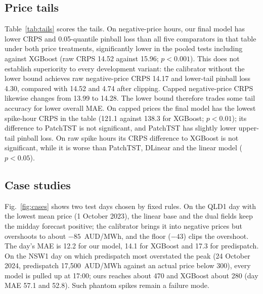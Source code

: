 \documentclass[preprint,12pt]{elsarticle}
\begin{document}
\subsection{Price tails}
Table~\ref{tab:tails} scores the tails. On negative-price hours, our final model has lower CRPS and 0.05-quantile pinball loss than all five comparators in that table under both price treatments, significantly lower in the pooled tests including against XGBoost (raw CRPS 14.52 against 15.96; $p<0.001$). This does not establish superiority to every development variant: the calibrator without the lower bound achieves raw negative-price CRPS 14.17 and lower-tail pinball loss 4.30, compared with 14.52 and 4.74 after clipping. Capped negative-price CRPS likewise changes from 13.99 to 14.28. The lower bound therefore trades some tail accuracy for lower overall MAE. On capped prices the final model has the lowest spike-hour CRPS in the table (121.1 against 138.3 for XGBoost; $p<0.01$); its difference to PatchTST is not significant, and PatchTST has slightly lower upper-tail pinball loss. On raw spike hours its CRPS difference to XGBoost is not significant, while it is worse than PatchTST, DLinear and the linear model ($p<0.05$).

\begin{table}[t]
\centering
\caption{Probabilistic scores in the price tails, main setting, mean of the three regions, scoring seed-averaged quantiles. Lower is better for losses; best among the displayed models is bold. Coverage is evaluated over all test hours. $^{\dagger}$/$^{\ddagger}$: ours is significantly better/worse than that model in a pooled Diebold--Mariano test on per-origin event-hour losses ($p<0.05$). Point estimates average event-hour losses within each region; tests first average within each origin, so their differences use a different weighting.}
\label{tab:tails}
\resizebox{\textwidth}{!}{}
\end{table}

\subsection{Case studies}
Fig.~\ref{fig:cases} shows two test days chosen by fixed rules. On the QLD1 day with the lowest mean price (1 October 2023), the linear base and the dual fields keep the midday forecast positive; the calibrator brings it into negative prices but overshoots to about $-85$~AUD/MWh, and the floor ($-43$) clips the overshoot. The day's MAE is 12.2 for our model, 14.1 for XGBoost and 17.3 for predispatch. On the NSW1 day on which predispatch most overstated the peak (24 October 2024, predispatch 17{,}500~AUD/MWh against an actual price below 300), every model is pulled up at 17:00; ours reaches about 470 and XGBoost about 280 (day MAE 57.1 and 52.8). Such phantom spikes remain a failure mode.
\end{document}
